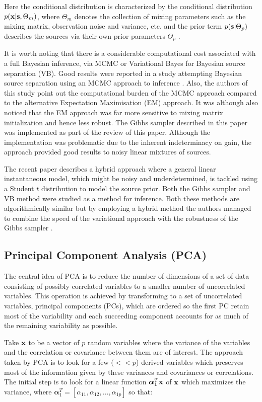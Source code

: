 Here the conditional distribution is characterized by the conditional distribution $p(\textrm{\textbf{x}}|\textrm{\textbf{s}},\Theta_m)$, where $\Theta_m$ denotes the collection of mixing parameters such as the mixing matrix, observation noise and variance, etc. and the prior term $p(\textrm{\textbf{s}}|\Theta_p)$ describes the sources via their own prior parameters $\Theta_p$ \citep{Cemgil2007}.

It is worth noting that there is a considerable computational cost associated with a full Bayesian inference, via MCMC or Variational Bayes for Bayesian source separation (VB). Good results were reported in a study attempting Bayesian source separation using an MCMC approach to inference \citep{Fevotte2006}. Also, the authors of this study point out the computational burden of the MCMC approach compared to the alternative Expectation Maximisation (EM) approach. It was although also noticed that the EM approach was far more sensitive to mixing matrix initialization and hence less robust. The Gibbs sampler described in this paper was implemented as part of the review of this paper. Although the implementation was problematic due to the inherent indeterminacy on gain, the approach provided good results to noisy linear mixtures of sources.

The recent paper \cite{Cemgil2007} describes a hybrid approach where a general linear instantaneous model, which might be noisy and underdetermined, is tackled using a Student $t$ distribution to model the source prior. Both the Gibbs sampler and VB method were studied as a method for inference. Both these methods are algorithmically similar but by employing a hybrid method the authors managed to combine the speed of the variational approach with the robustness of the Gibbs sampler \citep{Cemgil2007}.

\subsection{Principal Component Analysis (PCA)}
The central idea of PCA is to reduce the number of dimensions of a set of data consisting of possibly correlated variables to a smaller number of uncorrelated variables. This operation is achieved by transforming to a set of uncorrelated variables, principal components (PCs), which are ordered so the first PC retain most of the variability and each succeeding component accounts for as much of the remaining variability as possible.

Take $\textrm{\textbf{x}}$ to be a vector of $p$ random variables where the variance of the variables and the correlation or covariance between them are of interest. The approach taken by PCA is to look for a few ($<<p$) derived variables which preserves most of the information given by these variances and covariances or correlations. The initial step is to look for a linear function $\boldsymbol\alpha_1^T \textrm{\textbf{x}}$ of $\textrm{\textbf{x}}$ which maximizes the variance, where $\boldsymbol\alpha_1^T =  [\alpha_{1{}1},\alpha_{1{}2},\ldots,\alpha_{1{}p}]$ so that:

